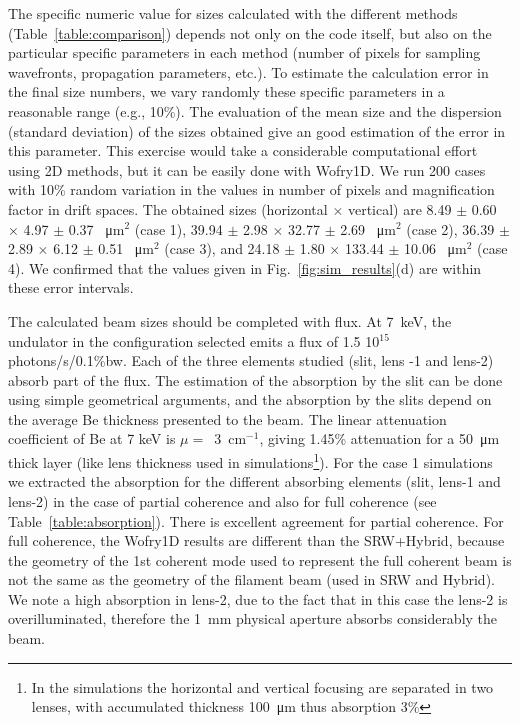 \documentclass{iucr}              %
\begin{document}
The specific numeric value for sizes calculated with the different methods (Table~\ref{table:comparison}) depends not only on the code itself, but also on the particular specific parameters in each method (number of pixels for sampling wavefronts, propagation parameters, etc.). To estimate the calculation error in the final size numbers, we vary randomly these specific parameters in a reasonable range (e.g., 10\%). The evaluation of the mean size and the dispersion (standard deviation) of the sizes obtained give an good estimation of the error in this parameter. This exercise would take a considerable computational effort using 2D methods, but it can be easily done with Wofry1D. We run 200 cases with 10\% random variation in the values in number of pixels and magnification factor in drift spaces. The obtained sizes (horizontal $\times$ vertical) are  
8.49 $\pm$ 0.60 $\times$ 4.97 $\pm$ 0.37 \SI{}{\micro\meter}$^2$ (case 1),
39.94 $\pm$ 2.98 $\times$ 32.77 $\pm$ 2.69 \SI{}{\micro\meter}$^2$ (case 2),
36.39 $\pm$ 2.89 $\times$ 6.12 $\pm$ 0.51 \SI{}{\micro\meter}$^2$ (case 3), and
24.18 $\pm$ 1.80 $\times$ 133.44 $\pm$ 10.06 \SI{}{\micro\meter}$^2$ (case 4). We confirmed that the values given in Fig.~\ref{fig:sim_results}(d) are within these error intervals.


The calculated beam sizes should be completed with flux. At \SI{7}{keV}, the undulator in the configuration selected emits a flux of 1.5 10$^{15}$ photons/s/0.1\%bw. Each of the three elements studied (slit, lens -1 and lens-2) absorb part of the flux. The estimation of the absorption by the slit can be done using simple geometrical arguments, and the absorption by the slits depend on the average Be thickness presented to the beam. The linear attenuation coefficient of Be at 7 keV is $\mu=$~\SI{3}{\centi\meter}$^{-1}$, giving 1.45\% attenuation for a \SI{50}{\micro\meter} thick layer (like lens thickness used in simulations\footnote{In the simulations the horizontal and vertical focusing are separated in two lenses, with accumulated thickness \SI{100}{\micro\meter} thus absorption 3\%}). For the case 1 simulations we extracted the absorption for the different absorbing elements (slit, lens-1 and lens-2) in the case of partial coherence and also for full coherence (see Table~\ref{table:absorption}).
There is excellent agreement for partial coherence. For full coherence, the Wofry1D results are different than the SRW+Hybrid, because the geometry of the 1st coherent mode used to represent the full coherent beam is not the same as the geometry of the filament beam (used in SRW and Hybrid). We note a high absorption in lens-2, due to the fact that in this case the lens-2 is overilluminated, therefore the \SI{1}{\milli\meter} physical aperture absorbs considerably the beam.
\end{document}
